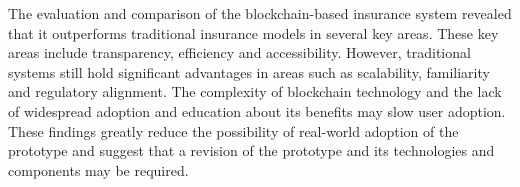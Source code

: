 The evaluation and comparison of the blockchain-based insurance system revealed that it outperforms traditional insurance models in several key areas. These key areas include transparency, efficiency and accessibility. However, traditional systems still hold significant advantages in areas such as scalability, familiarity and regulatory alignment. The complexity of blockchain technology and the lack of widespread adoption and education about its benefits may slow user adoption. These findings greatly reduce the possibility of real-world adoption of the prototype and suggest that a revision of the prototype and its technologies and components may be required.